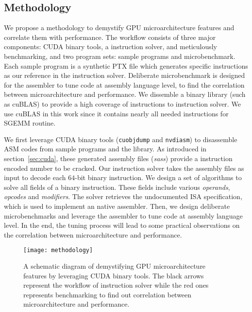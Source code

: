\subsection{Methodology}

We propose a methodology to demystify GPU microarchitecture features and correlate them with performance. 
The workflow consists of three major components: CUDA binary tools, a instruction solver, and meticulously benchmarking, and two program sets: sample programs and microbenchmark.
Each sample program is a synthetic PTX file which generates specific instructions as our reference in the instruction solver. 
Deliberate microbenchmark is designed for the assembler to tune code at assembly language level, to find the correlation between microarchitecture and performance.
We dissemble a binary library (such as cuBLAS) to provide a high coverage of instructions to instruction solver.
We use cuBLAS in this work since it contains nearly all needed instructions for SGEMM routine. 

We first leverage CUDA binary tools ({\tt cuobjdump} and {\tt nvdiasm}) to disassemble ASM codes from sample programs and the library. 
As introduced in section~\ref{sec:cuda}, these generated assembly files ({\em sass}) provide a instruction encoded number to be cracked.
Our instruction solver takes the assembly files as input to decode each $64$-bit binary instruction. 
We design a set of algorithms to solve all fields of a binary instruction. 
These fields include various {\em operands}, {\em opcodes} and {\em modifiers}. The solver retrieves the undocumented ISA specification, which is used to implement an native assembler. Then, we design deliberate microbenchmarks and leverage the assembler to tune code at assembly language level. In the end, the tuning process will lead to some practical observations on the correlation between microarchitecture and performance.

\begin{figure}[htbp]
\begin{center}
\texttt{[image: methodology]}
\caption{A schematic diagram of demystifying GPU microarchitecture features by leveraging CUDA binary tools. The black arrows represent the workflow of instruction solver while the red ones represents benchmarking to find out correlation between microarchitecture and performance.}
\label{fig:workflow}
\end{center}
\end{figure}


